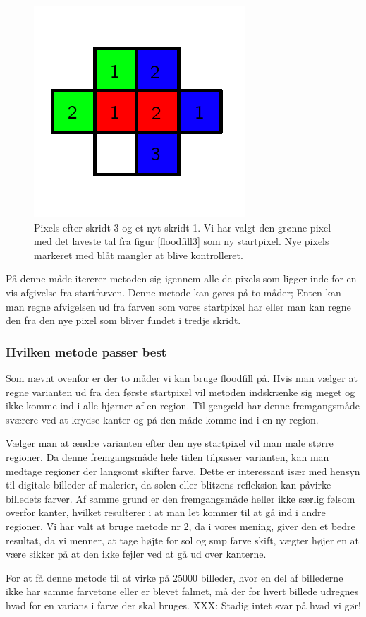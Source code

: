 {\begin{figure}[!h]
    \begin{center}
        \includegraphics[scale=0.42,angle=0]{afsnit/vores_implementation/billeder/flood_fill/floodfill4}
    \end{center}
    \caption[]{Pixels efter skridt 3 og et nyt skridt 1. Vi har valgt
    den grønne pixel med det laveste tal fra figur \ref{floodfill3} som
    ny startpixel. Nye pixels markeret med blåt mangler at blive
    kontrolleret.}
    \label{floodfill4}
\end{figure}

På denne måde itererer metoden sig igennem alle de pixels som ligger
inde for en vis afgivelse fra startfarven. Denne metode kan gøres på to
måder; Enten kan man regne afvigelsen ud fra farven som vores startpixel
har eller man kan regne den fra den nye pixel som bliver fundet i tredje
skridt.

\subsubsection{Hvilken metode passer best}
Som nævnt ovenfor er der to måder vi kan bruge floodfill på. Hvis man
vælger at regne varianten ud fra den første startpixel vil metoden
indskrænke sig meget og ikke komme ind i alle hjørner af en region. Til
gengæld har denne fremgangsmåde sværere ved at krydse kanter og på den
måde komme ind i en ny region.

Vælger man at ændre varianten efter den nye startpixel vil man male
større regioner. Da denne fremgangsmåde hele tiden tilpasser varianten,
kan man medtage regioner der langsomt skifter farve. Dette er
interessant især med hensyn til digitale billeder af malerier, da solen
eller blitzens refleksion kan påvirke billedets farver. Af samme grund er
den fremgangsmåde heller ikke særlig følsom overfor kanter, hvilket
resulterer i at man let kommer til at gå ind i andre regioner.
Vi har valt at bruge metode nr 2, da i vores mening, giver den
et bedre resultat, da vi menner, at tage højte for sol og smp farve
skift, vægter højer en at være sikker på at den ikke fejler ved at gå ud
over kanterne.

For at få denne metode til at virke på 25000 billeder, hvor en del af
billederne ikke har samme farvetone eller er blevet falmet, må der
for hvert billede udregnes hvad for en varians i farve der skal bruges.
XXX: Stadig intet svar på hvad vi gør!

}

